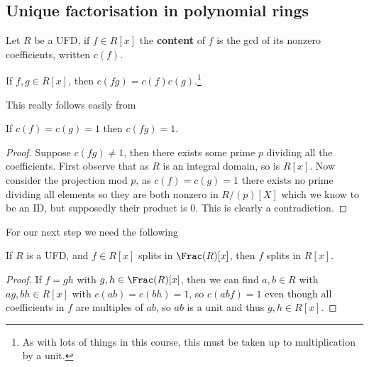 \documentclass{article}
\begin{document}
\subsection{Unique factorisation in polynomial rings}

\begin{definition}
    Let $R$ be a UFD, if $f\in R[x]$ the \textbf{content} of $f$ is the gcd of its nonzero coefficients, written $c(f)$.
\end{definition}

\begin{lemma}
    If $f,g\in R[x]$, then $c(fg)=c(f)c(g)$.\footnote{As with lots of things in this course, this must be taken up to multiplication by a unit.}
\end{lemma}

This really follows easily from

\begin{lemma}
    If $c(f)=c(g)=1$ then $c(fg)=1$.
    \begin{proof}
        Suppose $c(fg)\neq 1$, then there exists some prime $p$ dividing all the coefficients. First observe that as $R$ is an integral domain, so is $R[x]$. Now consider the projection mod $p$, as $c(f)=c(g)=1$ there exists no prime dividing all elements so they are both nonzero in $R/(p)[X]$ which we know to be an ID, but supposedly their product is $0$. This is clearly a contradiction.
    \end{proof}
\end{lemma}

For our next step we need the following 

\begin{lemma}
    If $R$ is a UFD, and $f\in R[x]$ splits in $\Frac(R)[x]$, then $f$ splits in $R[x]$.\begin{proof}
        If $f=gh$ with $g,h\in \Frac(R)[x]$, then we can find $a,b\in R$ with $ag,bh \in R[x]$ with $c(ab)=c(bh)=1$, so $c(abf) = 1$ even though all coefficients in $f$ are multiples of $ab$, so $ab$ is a unit and thus $g,h\in R[x]$.
    \end{proof}
\end{lemma}
\end{document}
